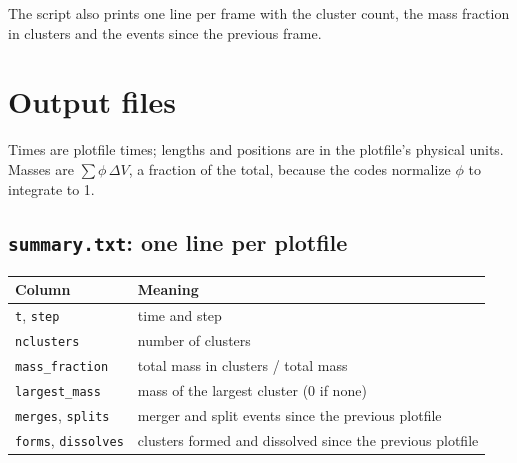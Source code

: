 \documentclass[11pt]{article}
\newcommand{\code}[1]{\texttt{#1}}
\begin{document}
The script also prints one line per frame with the cluster count, the mass
fraction in clusters and the events since the previous frame.

\section{Output files}

Times are plotfile times; lengths and positions are in the plotfile's physical
units. Masses are $\sum\phi\,\Delta V$, a fraction of the total, because the
codes normalize $\phi$ to integrate to 1.

\subsection*{\code{summary.txt}: one line per plotfile}
\begin{center}
\begin{tabularx}{\textwidth}{@{}l L@{}}
\toprule
Column & Meaning \\
\midrule
\code{t}, \code{step} & time and step \\
\code{nclusters} & number of clusters \\
\code{mass\_fraction} & total mass in clusters / total mass \\
\code{largest\_mass} & mass of the largest cluster (0 if none) \\
\code{merges}, \code{splits} & merger and split events since the previous plotfile \\
\code{forms}, \code{dissolves} & clusters formed and dissolved since the previous plotfile \\
\bottomrule
\end{tabularx}
\end{center}
\end{document}
